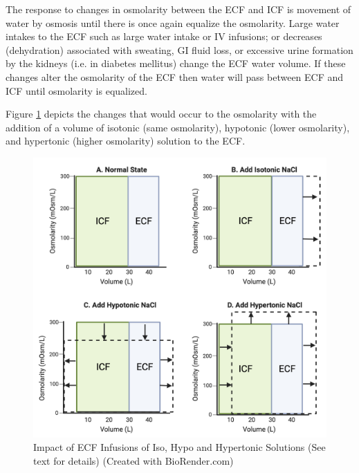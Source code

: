 The response to changes in osmolarity between the ECF and ICF is movement of water by osmosis until there is once again equalize the osmolarity. Large water intakes to the ECF such as large water intake or IV infusions; or decreases (dehydration) associated with sweating, GI fluid loss, or excessive urine formation by the kidneys (i.e. in diabetes mellitus) change the ECF water volume. If these changes alter the osmolarity of the ECF then water will pass between ECF and ICF until osmolarity is equalized.

Figure \ref{fig:iso_hypo_hypertonic} depicts the changes that would occur to the osmolarity with the addition of a volume of isotonic (same osmolarity), hypotonic (lower osmolarity), and hypertonic (higher osmolarity) solution to the ECF.

\begin{figure}[!h]
    \centering
    \includegraphics[width=0.7\linewidth]{./figure/iso_hypo_hypertonic.png}
    \caption{Impact of ECF Infusions of Iso, Hypo and Hypertonic Solutions (See text for details) \footnotesize{(Created with BioRender.com)}}
    \label{fig:iso_hypo_hypertonic}
\end{figure}


